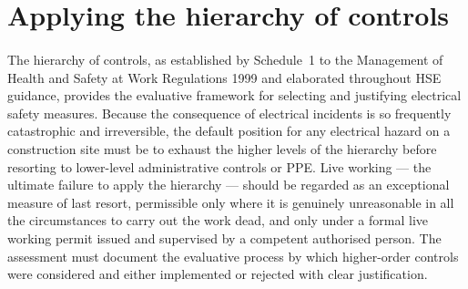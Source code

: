 \section{Applying the hierarchy of controls}
\label{sec:elec_hierarchy}

\paragraph{}
The hierarchy of controls, as established by Schedule~1 to the Management of Health and Safety at Work Regulations 1999 and elaborated throughout HSE guidance, provides the evaluative framework for selecting and justifying electrical safety measures. Because the consequence of electrical incidents is so frequently catastrophic and irreversible, the default position for any electrical hazard on a construction site must be to exhaust the higher levels of the hierarchy before resorting to lower-level administrative controls or PPE. Live working --- the ultimate failure to apply the hierarchy --- should be regarded as an exceptional measure of last resort, permissible only where it is genuinely unreasonable in all the circumstances to carry out the work dead, and only under a formal live working permit issued and supervised by a competent authorised person. The assessment must document the evaluative process by which higher-order controls were considered and either implemented or rejected with clear justification.

